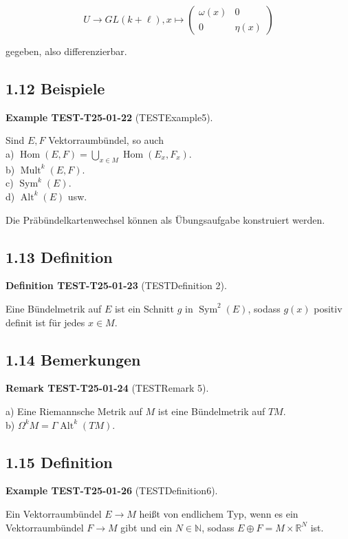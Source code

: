 \documentclass[10pt, letterpaper]{article}
\newcommand{\CustomHeading}[3]{%
  \par\medskip\noindent%
  \textbf{#1 #2} \textnormal{(#3)}.\enskip%
}
\newenvironment{DEF}[2]{\begin{unitbox}\CustomHeading{Definition}{#1}{#2}}{\end{unitbox}}
\newenvironment{REM}[2]{\begin{unitbox}\CustomHeading{Remark}{#1}{#2}}{\end{unitbox}}
\newenvironment{EXA}[2]{\begin{unitbox}\CustomHeading{Example}{#1}{#2}}{\end{unitbox}}
\begin{document}
$$
U \rightarrow G L(k+\ell), x \mapsto\left(\begin{array}{cc}
\omega(x) & 0 \\
0 & \eta(x)
\end{array}\right)
$$

gegeben, also differenzierbar.

\subsection*{1.12 Beispiele}
\begin{EXA}{TEST-T25-01-22}{TESTExample5}
Sind $E, F$ Vektorraumbündel, so auch\\
a) $\operatorname{Hom}(E, F)=\bigcup_{x \in M} \operatorname{Hom}\left(E_{x}, F_{x}\right)$.\\
b) $\operatorname{Mult}^{k}(E, F)$.\\
c) $\operatorname{Sym}^{k}(E)$.\\
d) $\operatorname{Alt}^{k}(E)$ usw.

Die Präbündelkartenwechsel können als Übungsaufgabe konstruiert werden.
\end{EXA}

\subsection*{1.13 Definition}
\begin{DEF}{TEST-T25-01-23}{TESTDefinition 2}
Eine Bündelmetrik auf $E$ ist ein Schnitt $g$ in $\operatorname{Sym}^{2}(E)$, sodass $g(x)$ positiv definit ist für jedes $x \in M$.
\end{DEF}

\subsection*{1.14 Bemerkungen}
\begin{REM}{TEST-T25-01-24}{TESTRemark 5}
a) Eine Riemannsche Metrik auf $M$ ist eine Bündelmetrik auf $T M$.\\
b) $\Omega^{k} M=\Gamma \operatorname{Alt}^{k}(T M)$.
\end{REM}

\subsection*{1.15 Definition}
\begin{EXA}{TEST-T25-01-26}{TESTDefinition6}
Ein Vektorraumbündel $E \rightarrow M$ heißt von endlichem Typ, wenn es ein Vektorraumbündel $F \rightarrow M$ gibt und ein $N \in \mathbb{N}$, sodass $E \oplus F=M \times \mathbb{R}^{N}$ ist.
\end{EXA}
\end{document}
